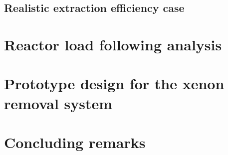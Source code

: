 \subsection{Realistic extraction efficiency case}


\section{Reactor load following analysis}

\section{Prototype design for the xenon removal system}

\section{Concluding remarks}
